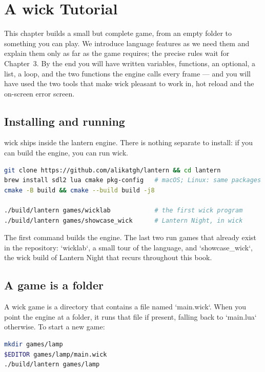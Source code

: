\chapter{A wick Tutorial}

This chapter builds a small but complete game, from an empty folder to
something you can play. We introduce language features as we need them and
explain them only as far as the game requires; the precise rules wait for
Chapter~3. By the end you will have written variables, functions, an optional,
a list, a loop, and the two functions the engine calls every frame --- and you
will have used the two tools that make wick pleasant to work in, hot reload
and the on-screen error screen.

\section{Installing and running}

wick ships inside the lantern engine. There is nothing separate to install:
if you can build the engine, you can run wick.

\begin{lstlisting}[language=bash,basicstyle=\ttfamily\small,keywordstyle={}]
git clone https://github.com/alikatgh/lantern && cd lantern
brew install sdl2 lua cmake pkg-config   # macOS; Linux: same packages
cmake -B build && cmake --build build -j8

./build/lantern games/wicklab            # the first wick program
./build/lantern games/showcase_wick      # Lantern Night, in wick
\end{lstlisting}

\noindent
The first command builds the engine. The last two run games that already
exist in the repository: `wicklab`, a small tour of the language, and
`showcase_wick`, the wick build of Lantern Night that recurs throughout this
book.

\section{A game is a folder}

A wick game is a directory that contains a file named `main.wick`. When you
point the engine at a folder, it runs that file if present, falling back to
`main.lua` otherwise. To start a new game:

\begin{lstlisting}[language=bash,basicstyle=\ttfamily\small,keywordstyle={}]
mkdir games/lamp
$EDITOR games/lamp/main.wick
./build/lantern games/lamp
\end{lstlisting}

